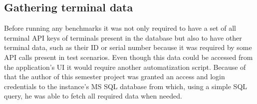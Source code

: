 \documentclass[12pt, a4paper]{article}
\begin{document}
\subsection{Gathering terminal data}
Before running any benchmarks it was not only required to have a set of all terminal API keys of terminals present in the database but also to have other terminal data, such as their ID or serial number because it was required by some API calls present in test scenarios.
Even though this data could be accessed from the application's UI it would require another automatization script.
Because of that the author of this semester project was granted an access and login credentials to the instance's MS SQL database from which, using a simple SQL query, he was able to fetch all required data when needed.
\end{document}
